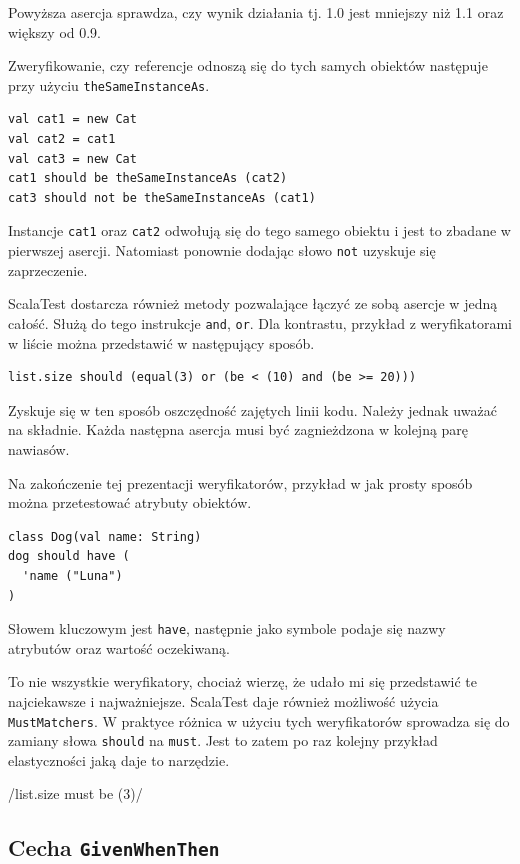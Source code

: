 \documentclass[brudnopis]{xmgr}
\begin{document}
Powyższa asercja sprawdza, czy wynik działania tj. 1.0 jest mniejszy niż 1.1 oraz większy od 0.9.

Zweryfikowanie, czy referencje odnoszą się do tych samych obiektów następuje przy użyciu \texttt{theSameInstanceAs}.

\begin{verbatim}
val cat1 = new Cat
val cat2 = cat1
val cat3 = new Cat	
cat1 should be theSameInstanceAs (cat2)
cat3 should not be theSameInstanceAs (cat1)
\end{verbatim}

Instancje \texttt{cat1} oraz \texttt{cat2} odwołują się do tego samego obiektu i jest to zbadane w pierwszej asercji. Natomiast ponownie dodając słowo \texttt{not} uzyskuje się zaprzeczenie.

ScalaTest dostarcza również metody pozwalające łączyć ze sobą asercje w jedną całość. Służą do tego instrukcje \texttt{and}, \texttt{or}. Dla kontrastu, przykład z weryfikatorami w liście można przedstawić w następujący sposób.

\begin{verbatim}
list.size should (equal(3) or (be < (10) and (be >= 20)))
\end{verbatim}

Zyskuje się w ten sposób oszczędność zajętych linii kodu. Należy jednak uważać na składnie. Każda następna asercja musi być zagnieżdzona w kolejną parę nawiasów.

Na zakończenie tej prezentacji weryfikatorów, przykład w jak prosty sposób można przetestować atrybuty obiektów.

\begin{verbatim}
class Dog(val name: String)
dog should have (
  'name ("Luna")
)
\end{verbatim}

Słowem kluczowym jest \texttt{have}, następnie jako symbole podaje się nazwy atrybutów oraz wartość oczekiwaną.

To nie wszystkie weryfikatory, chociaż wierzę, że udało mi się przedstawić te najciekawsze i najważniejsze. ScalaTest daje również możliwość użycia \texttt{MustMatchers}. W praktyce różnica w użyciu tych weryfikatorów sprowadza się do zamiany słowa \texttt{should} na \texttt{must}. Jest to zatem po raz kolejny przykład elastyczności jaką daje to narzędzie.

/list.size must be (3)/ 

\subsection{Cecha \texttt{GivenWhenThen}}
\end{document}
